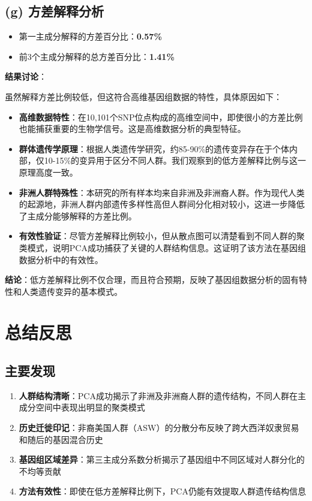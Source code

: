 \documentclass[a4paper]{article}
\begin{document}
\subsection{(g) 方差解释分析}
\begin{itemize}
    \item 第一主成分解释的方差百分比：\textbf{0.57\%}
    \item 前3个主成分解释的总方差百分比：\textbf{1.41\%}
\end{itemize}

\textbf{结果讨论}：

虽然解释方差比例较低，但这符合高维基因组数据的特性，具体原因如下：

\begin{itemize}
    \item \textbf{高维数据特性}：在10,101个SNP位点构成的高维空间中，即使很小的方差比例也能捕获重要的生物学信号。这是高维数据分析的典型特征。
    
    \item \textbf{群体遗传学原理}：根据人类遗传学研究，约85-90\%的遗传变异存在于个体内部，仅10-15\%的变异用于区分不同人群。我们观察到的低方差解释比例与这一原理高度一致。
    
    \item \textbf{非洲人群特殊性}：本研究的所有样本均来自非洲及非洲裔人群。作为现代人类的起源地，非洲人群内部遗传多样性高但人群间分化相对较小，这进一步降低了主成分能够解释的方差比例。
    
    \item \textbf{有效性验证}：尽管方差解释比例较小，但从散点图可以清楚看到不同人群的聚类模式，说明PCA成功捕获了关键的人群结构信息。这证明了该方法在基因组数据分析中的有效性。
\end{itemize}

\textbf{结论}：低方差解释比例不仅合理，而且符合预期，反映了基因组数据分析的固有特性和人类遗传变异的基本模式。

\section{总结反思}

\subsection{主要发现}
\begin{enumerate}
    \item \textbf{人群结构清晰}：PCA成功揭示了非洲及非洲裔人群的遗传结构，不同人群在主成分空间中表现出明显的聚类模式
    \item \textbf{历史迁徙印记}：非裔美国人群（ASW）的分散分布反映了跨大西洋奴隶贸易和随后的基因混合历史
    \item \textbf{基因组区域差异}：第三主成分系数分析揭示了基因组中不同区域对人群分化的不均等贡献
    \item \textbf{方法有效性}：即使在低方差解释比例下，PCA仍能有效提取人群遗传结构信息
\end{enumerate}
\end{document}
